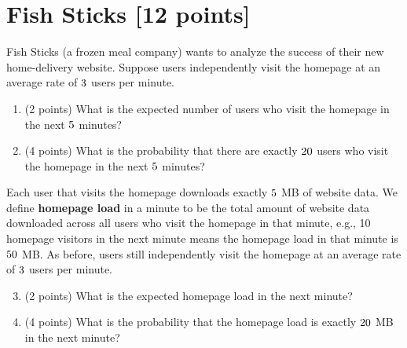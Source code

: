 \newpage
\section{Fish Sticks [12 points]}\label{sec:fish}
Fish Sticks (a frozen meal company) wants to analyze the success of their new home-delivery website. Suppose users independently visit the homepage at an average rate of $3{}$ users per minute.

\begin{enumerate}[label=\alph*.]

\item (2 points) What is the expected number of users who visit the homepage in the next $5{}$ minutes?
	
		
		

\item (4 points) What is the probability that there are exactly $20{}$ users who visit the homepage in the next $5{}$ minutes?
	
	

\end{enumerate}


Each user that visits the homepage downloads exactly $5{}$ MB of website data. We define \textbf{homepage load} in a minute to be the total amount of website data downloaded across all users who visit the homepage in that minute, e.g., 10 homepage visitors in the next minute means the homepage load in that minute is $5{}0$ MB. As before, users still independently visit the homepage at an average rate of $3{}$ users per minute.

\begin{enumerate}[label=\alph*.]
\setcounter{enumi}{2}

\item (2 points) What is the expected homepage load in the next minute?
	


\item (4 points) What is the probability that the homepage load is exactly $20{}$ MB in the next minute?
	


\end{enumerate}